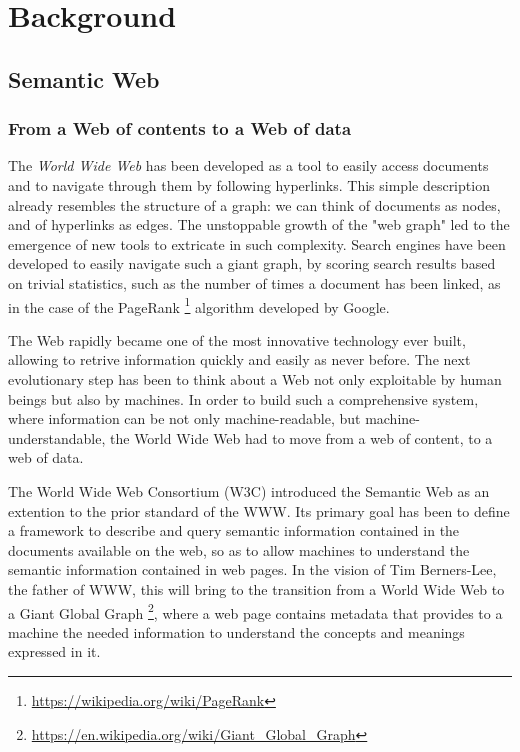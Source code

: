 \documentclass[%
    corpo=13.5pt,
    twoside,
    oldstyle,
    tipotesi=magistrale,
    greek,
    evenboxes
]{toptesi}
\begin{document}
\chapter{Background}

\section{Semantic Web}

\subsection{From a Web of contents to a Web of data}

The \emph{World Wide Web} has been developed as a tool to easily access
documents and to navigate through them by following hyperlinks.
This simple description already resembles the structure of a graph: we can
think of documents as nodes, and of hyperlinks as edges. The unstoppable growth
of the "web graph" led to the emergence of new tools to extricate in such
complexity. Search engines have been developed to easily navigate such a giant
graph, by scoring search results based on trivial statistics, such as the number
of times a document has been linked, as in the case of the PageRank
\footnote{\url{https://wikipedia.org/wiki/PageRank}} algorithm developed by
Google.
\newline

The Web rapidly became one of the most innovative technology ever built,
allowing to retrive information quickly and easily as never before.
The next evolutionary step has been to think about a Web not only exploitable by
human beings but also by machines. In order to build such a comprehensive
system, where information can be not only machine-readable, but
machine-understandable, the World Wide Web had to move from a web of content, to
a web of data.
\newline

The World Wide Web Consortium (W3C) introduced the Semantic Web as an extention
to the prior standard of the WWW. Its primary goal has been
to define a framework to describe and query semantic information contained
in the documents available on the web, so as to allow machines to understand
the semantic information contained in web pages. In the vision of Tim
Berners-Lee, the father of WWW, this will bring to the transition from a
World Wide Web to a Giant Global Graph
\footnote{\url{https://en.wikipedia.org/wiki/Giant_Global_Graph}}, where a
web page contains metadata that provides to a machine the needed information to
understand the concepts and meanings expressed in it.
\end{document}
